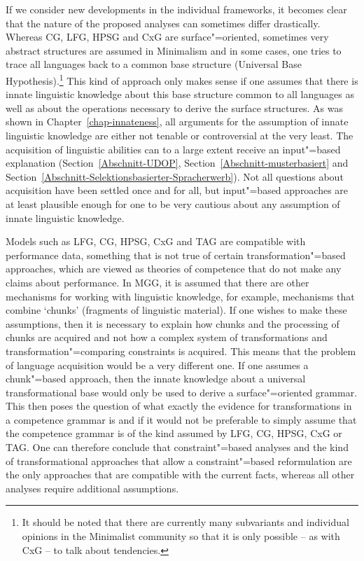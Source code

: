 If we consider new developments in the individual frameworks, it becomes clear that the nature of the proposed analyses can sometimes differ drastically.
Whereas CG, LFG, HPSG and CxG are surface"=oriented, sometimes very abstract structures are assumed in Minimalism and in some cases, one tries to trace all languages back
to a common base structure (Universal Base Hypothesis).\footnote{%
  It should be noted that there are currently many subvariants and individual opinions in the Minimalist community so that it
  is only possible -- as with CxG -- to talk about tendencies.%
} This kind of approach only makes sense if one assumes that there is innate linguistic knowledge about this base structure
common to all languages as well as about the operations necessary to derive the surface structures.
As was shown in Chapter~\ref{chap-innateness}, all arguments for the assumption of innate linguistic knowledge are either not tenable
or controversial at the very least.
The acquisition of linguistic abilities can to a large extent receive an input"=based explanation
(Section~\ref{Abschnitt-UDOP}, Section~\ref{Abschnitt-musterbasiert} and
Section~\ref{Abschnitt-Selektionsbasierter-Spracherwerb}). Not all questions about acquisition have
been settled once and for all, but input"=based approaches are at least plausible enough for one to be very cautious about any assumption of innate linguistic knowledge.

Models such as LFG, CG, HPSG, CxG and TAG are compatible with performance data, something that is
not true of certain transformation"=based approaches, which are viewed as theories of competence
that do not make any claims about performance. In MGG, it is assumed that there are other mechanisms
for working with linguistic knowledge, for example, mechanisms that combine `chunks' (fragments of linguistic material). If one wishes to make these assumptions,
then it is necessary to explain how chunks and the processing of chunks are acquired and not how a complex system of transformations and transformation"=comparing
constraints is acquired. This means that the problem of language acquisition would be a very different one. If one assumes a chunk"=based approach, then the innate
knowledge about a universal transformational base would only be used to derive a surface"=oriented grammar. This then poses the question of what exactly the evidence
for transformations in a competence grammar is and if it would not be preferable to simply assume that the competence grammar is of the kind assumed by LFG, CG, HPSG,
CxG or TAG. One can therefore conclude that constraint"=based analyses and the kind of
transformational approaches that allow a constraint"=based reformulation are the only approaches that are compatible with the current facts, whereas all other analyses require additional assumptions.

